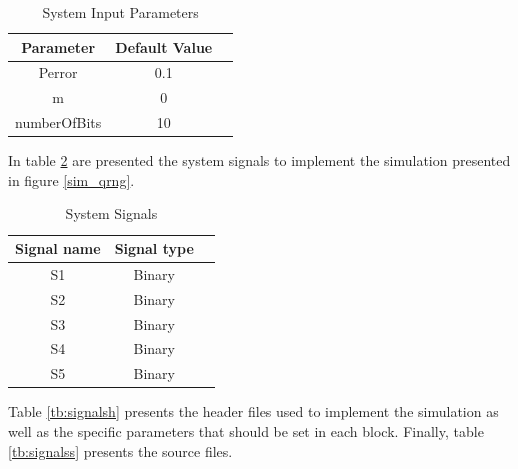 \begin{refsection}
\begin{table}[H]
\centering
\caption{System Input Parameters}
\label{tb:inputparameters2}
\begin{tabular}{|c|c|c|}
\hline
\textbf{Parameter}                      & \textbf{Default Value}                                        \\ \hline
Perror                                  & 0.1                                                           \\ \hline
m                                       & 0                                                             \\ \hline
numberOfBits                            & 10                                                            \\ \hline

\end{tabular}
\end{table}

In table \ref{tb:signals2} are presented the system signals to implement the simulation presented in figure \ref{sim_qrng}.
\begin{table}[H]
\centering
\caption{System Signals}
\label{tb:signals2}
\begin{tabular}{|c|c|c|}
\hline
\textbf{Signal name}                            & \textbf{Signal type}                      \\ \hline
S1                                              &  Binary                                   \\ \hline
S2                                              &  Binary                                   \\ \hline
S3                                              &  Binary                                   \\ \hline
S4                                              &  Binary                                   \\ \hline
S5                                              &  Binary                                   \\ \hline
\end{tabular}
\end{table}

Table \ref{tb:signalsh} presents the header files used to implement the simulation as well as the specific parameters that should be set in each block. Finally, table \ref{tb:signalss} presents the source files.


\end{refsection}
